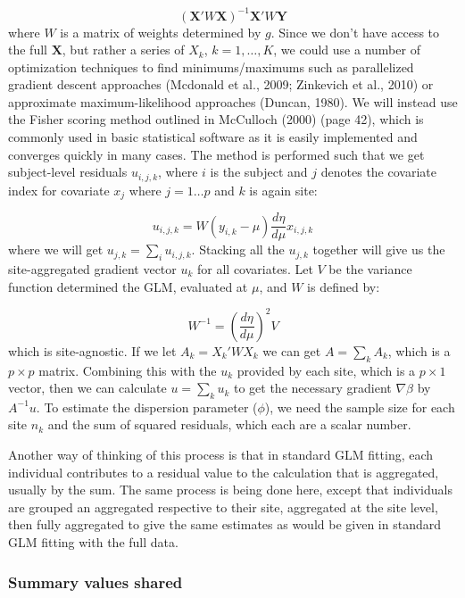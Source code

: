 \documentclass[]{elsarticle} %
\begin{document}
\[
(\mathbf{X}'W\mathbf{X})^{-1} \mathbf{X}'W\mathbf{Y}
\]
where \(W\) is a matrix of weights determined by \(g\). Since we don't have access to the full \(\mathbf{X}\), but rather a series of \(X_{k}\), \(k = 1, \dots, K\), we could use a number of optimization techniques to find minimums/maximums such as parallelized gradient descent approaches (Mcdonald et al., 2009; Zinkevich et al., 2010) or approximate maximum-likelihood approaches (Duncan, 1980). We will instead use the Fisher scoring method outlined in McCulloch (2000) (page 42), which is commonly used in basic statistical software as it is easily implemented and converges quickly in many cases. The method is performed such that we get subject-level residuals \(u_{i,j,k}\), where \(i\) is the subject and \(j\) denotes the covariate index for covariate \(x_{j}\) where \(j = 1\dots p\) and \(k\) is again site:

\[
u_{i,j, k} = W (y_{i,k} - \mu) \frac{d\eta}{d\mu}x_{i,j,k}
\]
where we will get \(u_{j, k} = \sum_{i} u_{i, j, k}\). Stacking all the \(u_{j,k}\) together will give us the site-aggregated gradient vector \(u_{k}\) for all covariates. Let \(V\) be the variance function determined the GLM, evaluated at \(\mu\), and \(W\) is defined by:

\[
W^{-1} = \left(\frac{d\eta}{d\mu}\right)^2V
\]
which is site-agnostic. If we let \(A_{k} = X_k'WX_k\) we can get \(A = \sum_{k}A_{k}\), which is a \(p \times p\) matrix. Combining this with the \(u_{k}\) provided by each site, which is a \(p\times 1\) vector, then we can calculate \(u = \sum_{k} u_{k}\) to get the necessary gradient \(\nabla\beta\) by \(A^{-1} u\). To estimate the dispersion parameter (\(\phi\)), we need the sample size for each site \(n_{k}\) and the sum of squared residuals, which each are a scalar number.

Another way of thinking of this process is that in standard GLM fitting, each individual contributes to a residual value to the calculation that is aggregated, usually by the sum. The same process is being done here, except that individuals are grouped an aggregated respective to their site, aggregated at the site level, then fully aggregated to give the same estimates as would be given in standard GLM fitting with the full data.

\hypertarget{summary-values-shared}{%
\subsubsection{Summary values shared}\label{summary-values-shared}}
\end{document}

